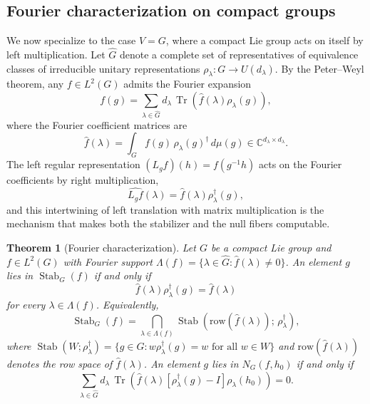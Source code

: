 \documentclass[11pt]{article}
\newtheorem{theorem}{Theorem}
\DeclareMathOperator{\Tr}{Tr}
\DeclareMathOperator{\Stab}{Stab}
\newcommand{\CC}{\mathbb{C}}
\newcommand{\fhat}{\hat{f}}
\newcommand{\dmu}{\,d\mu}
\begin{document}
\subsection{Fourier characterization on compact groups}\label{sec:fourier}

We now specialize to the case $V = G$, where a compact Lie group acts on itself by left multiplication. Let $\hat{G}$ denote a complete set of representatives of equivalence classes of irreducible unitary representations $\rho_\lambda\colon G \to U(d_\lambda)$. By the Peter--Weyl theorem, any $f \in L^2(G)$ admits the Fourier expansion
\begin{equation}\label{eq:peter-weyl}
    f(g) = \sum_{\lambda \in \hat{G}} d_\lambda \, \Tr\!\left( \fhat(\lambda) \rho_\lambda(g) \right),
\end{equation}
where the Fourier coefficient matrices are
\begin{equation}\label{eq:fourier-coefficients}
    \fhat(\lambda) = \int_G f(g)\, \rho_\lambda(g)^\dagger \dmu(g) \in \CC^{d_\lambda \times d_\lambda}.
\end{equation}
The left regular representation $(L_g f)(h) = f(g^{-1}h)$ acts on the Fourier coefficients by right multiplication,
\begin{equation}\label{eq:left-fourier}
    \widehat{L_g f}(\lambda) = \fhat(\lambda)\rho_\lambda^\dagger(g),
\end{equation}
and this intertwining of left translation with matrix multiplication is the mechanism that makes both the stabilizer and the null fibers computable.

\begin{theorem}[Fourier characterization]\label{thm:fourier-characterization}
Let $G$ be a compact Lie group and $f \in L^2(G)$ with Fourier support $\Lambda(f) = \{\lambda \in \hat{G} : \fhat(\lambda) \neq 0\}$. An element $g$ lies in $\Stab_G(f)$ if and only if
\begin{equation}\label{eq:stab-fourier}
    \fhat(\lambda)\rho_\lambda^\dagger(g) = \fhat(\lambda)
\end{equation}
for every $\lambda\in \Lambda(f)$. Equivalently,
\begin{equation}\label{eq:stab-intersection}
    \Stab_G(f) = \bigcap_{\lambda \in \Lambda(f)} \Stab\!\left( \mathrm{row}\!\left(\fhat(\lambda)\right);\, \rho_\lambda^\dagger \right),
\end{equation}
where $\Stab(W; \rho_\lambda^\dagger) = \{g \in G : w\rho_\lambda^\dagger(g) = w \text{ for all } w \in W\}$ and $\mathrm{row}(\fhat(\lambda))$ denotes the row space of $\fhat(\lambda)$. An element $g$ lies in $N_G(f, h_0)$ if and only if
\begin{equation}\label{eq:null-fiber-fourier}
    \sum_{\lambda \in \hat{G}} d_\lambda \, \Tr\!\left(\fhat(\lambda) [\rho_\lambda^\dagger(g) - I] \rho_\lambda(h_0) \right) = 0.
\end{equation}
\end{theorem}
\end{document}
